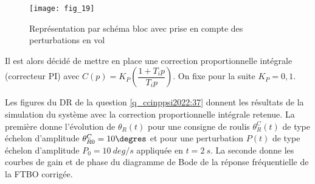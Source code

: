 \begin{figure}[H]
\centering
\texttt{[image: fig\_19]}
\caption{\label{fig_ccinppsi2022:19} Représentation par schéma bloc avec prise en compte des perturbations en vol}
\end{figure}


\ifprof
\begin{corrige}
\end{corrige}
\else
\fi

\ifprof
\begin{corrige}
\end{corrige}
\else
\fi

\ifprof
\begin{corrige}
\end{corrige}
\else
\fi

Il est alors décidé de mettre en place une correction proportionnelle intégrale (correcteur PI)
avec $C(p) = K_P\left(\dfrac{1+T_i p}{T_i p}\right)$. On fixe pour la suite $K_P = 0,1$.

\ifprof
\begin{corrige}
\end{corrige}
\else
\fi

Les figures du DR de la question \ref{q_ccinppsi2022:37} donnent les résultats de la simulation du système avec la
correction proportionnelle intégrale retenue. La première donne l’évolution de $\theta_R(t)$ pour une
consigne de roulis $\theta_R^C(t)$ de type échelon d’amplitude $\theta_{R0}^C = 10\degres$ et pour une perturbation $P(t)$ de
type échelon d’amplitude $P_0 =\SI{10}{deg/s}$ appliquée en $t = \SI{2}{s}$. La seconde donne les courbes
de gain et de phase du diagramme de Bode de la réponse fréquentielle de la FTBO corrigée.

